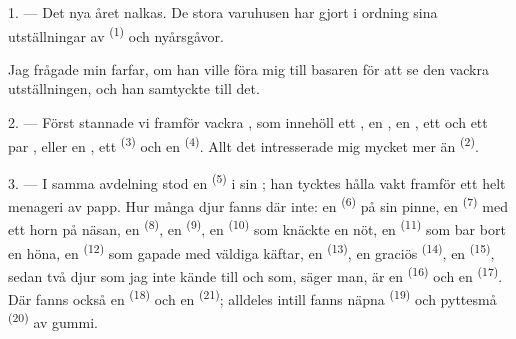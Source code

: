 %
%

\VUsaut{4.0mm}
\VUsaut{2.0mm}
\VUsaut{3.4mm}

1. --- Det nya året nalkas. De stora varuhusen har gjort i ordning sina utställningar av
 \textsuperscript{(1)} och nyårsgåvor.

Jag frågade min farfar, om han ville föra mig till basaren för att se den vackra
utställningen, och han samtyckte till det.

2. --- Först stannade vi framför vackra , som innehöll ett
, en , en , ett  och
ett par , eller en , ett  \textsuperscript{(3)}
och en  \textsuperscript{(4)}. Allt det intresserade mig mycket mer än
 \textsuperscript{(2)}.

\VUsaut{3.0mm}
\VUsaut{2.6mm}

3. --- I samma avdelning stod en  \textsuperscript{(5)} i sin
; han tycktes hålla vakt framför ett helt menageri av papp. Hur
många djur fanns där inte: en  \textsuperscript{(6)} på sin pinne, en
 \textsuperscript{(7)} med ett horn på näsan, en
 \textsuperscript{(8)}, en  \textsuperscript{(9)}, en
 \textsuperscript{(10)} som knäckte en nöt, en 
\textsuperscript{(11)} som bar bort en höna, en  \textsuperscript{(12)} som
gapade med väldiga käftar, en  \textsuperscript{(13)}, en graciös
 \textsuperscript{(14)}, en
 \textsuperscript{(15)}, sedan två djur som jag inte kände till
och som, säger man, är en  \textsuperscript{(16)} och en
 \textsuperscript{(17)}. Där fanns också en 
\textsuperscript{(18)} och en  \textsuperscript{(21)}; alldeles intill fanns
näpna  \textsuperscript{(19)} och pyttesmå
 \textsuperscript{(20)} av gummi.

